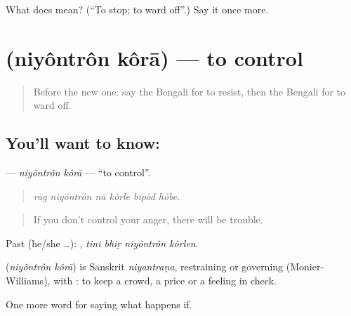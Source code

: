 \begin{tcolorbox}[breakable,colback=teal!4,colframe=teal!35!black,title={Before you move on}]
What does  mean? (\textquotedblleft{}To stop; to ward off\textquotedblright{}.) Say it once more.
\end{tcolorbox}
\section[\texorpdfstring{\bn{নিয়ন্ত্রণ} \bn{করা} (niyôntrôn kôrā)}{নিয়ন্ত্রণ করা (niyôntrôn kôrā)}]{  (niyôntrôn kôrā) — to control}

\label{lesson:BN-C374-niyontron-kora}



\begin{quote}
Before the new one: say the Bengali for to resist, then the Bengali for to ward off.
\end{quote}

\subsection*{You'll want to know:  }
\textbf{ } — \emph{niyôntrôn kôrā} — \textquotedblleft{}to control\textquotedblright{}.

\begin{quote}
     
\end{quote}

\begin{quote}
\emph{rāg niyôntrôn nā kôrle bipôd hôbe.}
\end{quote}

\begin{quote}
If you don't control your anger, there will be trouble.
\end{quote}

Past (he/she …):    , \emph{tini bhiṛ niyôntrôn kôrlen}.

\begin{cousinweb}
\textbf{ } (\emph{niyôntrôn kôrā}) is Sanskrit \emph{niyantraṇa}, restraining or governing (Monier-Williams), with : to keep a crowd, a price or a feeling in check.
\end{cousinweb}

\begin{grammarlens}[title={What you've built}]
One more word for saying what happens if.
\end{grammarlens}

